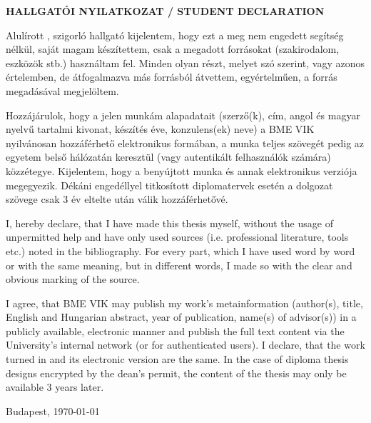 \begin{center}
\large
\textbf{HALLGATÓI NYILATKOZAT / STUDENT DECLARATION}\\
\end{center}

Alulírott \emph{\vikszerzoVezeteknev{} \vikszerzoKeresztnev}, szigorló hallgató kijelentem, hogy ezt a \vikmunkatipusat{} meg nem engedett segítség nélkül, saját magam készítettem, csak a megadott forrásokat (szakirodalom, eszközök stb.) használtam fel. Minden olyan részt, melyet szó szerint, vagy azonos értelemben, de átfogalmazva más forrásból átvettem, egyértelműen, a forrás megadásával megjelöltem.

Hozzájárulok, hogy a jelen munkám alapadatait (szerző(k), cím, angol és magyar nyelvű tartalmi kivonat, készítés éve, konzulens(ek) neve) a BME VIK nyilvánosan hozzáférhető elektronikus formában, a munka teljes szövegét pedig az egyetem belső hálózatán keresztül (vagy autentikált felhasználók számára) közzétegye. Kijelentem, hogy a benyújtott munka és annak elektronikus verziója megegyezik. Dékáni engedéllyel titkosított diplomatervek esetén a dolgozat szövege csak 3 év eltelte után válik hozzáférhetővé.
\break

I, \emph{\vikszerzoVezeteknev{} \vikszerzoKeresztnev} hereby declare, that I have made this thesis myself, without the usage of unpermitted help and have only used sources (i.e. professional literature, tools etc.) noted in the bibliography. For every part, which I have used word by word or with the same meaning, but in different words, I made so with the clear and obvious marking of the source.

I agree, that BME VIK may publish my work's metainformation (author(s), title, English and Hungarian abstract, year of publication, name(s) of advisor(s)) in a publicly available, electronic manner and publish the full text content via the University's internal network (or for authenticated users). I declare, that the work turned in and its electronic version are the same. In the case of diploma thesis designs encrypted by the dean's permit, the content of the thesis may only be available 3 years later.

\begin{flushleft}
\vspace*{1cm}
Budapest, \today
\end{flushleft}

\begin{flushright}
 \vspace*{1cm}
 \makebox[7cm]{\rule{6cm}{.4pt}}\\
 \makebox[7cm]{\emph{\vikszerzoVezeteknev{} \vikszerzoKeresztnev}}\\
\end{flushright}
\thispagestyle{empty}

\vfill
\clearpage
\thispagestyle{empty} %

\selectthesislanguage

